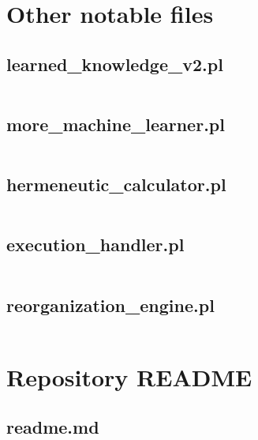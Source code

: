 \documentclass{article}
\begin{document}
\section{Other notable files}
\subsection{learned\_knowledge\_v2.pl}
\inputminted{prolog}{learned_knowledge_v2.pl}
\subsection{more\_machine\_learner.pl}
\inputminted{prolog}{more_machine_learner.pl}
\subsection{hermeneutic\_calculator.pl}
\inputminted{prolog}{hermeneutic_calculator.pl}
\subsection{execution\_handler.pl}
\inputminted{prolog}{execution_handler.pl}
\subsection{reorganization\_engine.pl}
\inputminted{prolog}{reorganization_engine.pl}

\section{Repository README}
\subsection{readme.md}
\inputminted{markdown}{readme.md}

\end{document}
